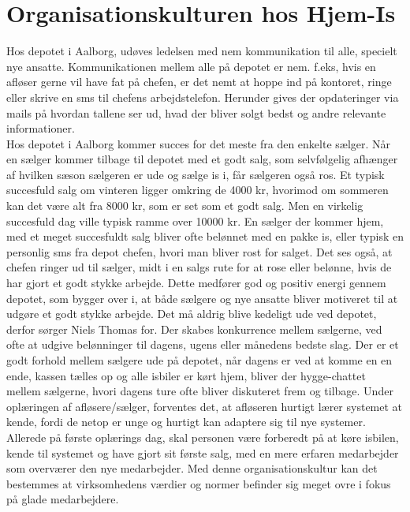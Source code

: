 \section{Organisationskulturen hos Hjem-Is}
Hos depotet i Aalborg, udøves ledelsen med nem kommunikation til alle, specielt nye ansatte. Kommunikationen mellem alle på depotet er nem. f.eks, hvis en afløser gerne vil have fat på chefen, er det nemt at hoppe ind på kontoret, ringe eller skrive en sms til chefens arbejdstelefon. Herunder gives der opdateringer via mails på hvordan tallene ser ud, hvad der bliver solgt bedst og andre relevante informationer. \\
Hos depotet i Aalborg kommer succes for det meste fra den enkelte sælger. Når en sælger kommer tilbage til depotet med et godt salg, som selvfølgelig afhænger af hvilken sæson sælgeren er ude og sælge is i, får sælgeren også ros. Et typisk succesfuld salg om vinteren ligger omkring de 4000 kr, hvorimod om sommeren kan det være alt fra 8000 kr, som er set som et godt salg. Men en virkelig succesfuld dag ville typisk ramme over 10000 kr. En sælger der kommer hjem, med et meget succesfuldt salg bliver ofte belønnet med en pakke is, eller typisk en personlig sms fra depot chefen, hvori man bliver rost for salget. Det ses også, at chefen ringer ud til sælger, midt i en salgs rute for at rose eller belønne, hvis de har gjort et godt stykke arbejde. Dette medfører god og positiv energi gennem depotet, som bygger over i, at både sælgere og nye ansatte bliver motiveret til at udgøre et godt stykke arbejde. Det må aldrig blive kedeligt ude ved depotet, derfor sørger Niels Thomas for. Der skabes konkurrence mellem sælgerne, ved ofte at udgive belønninger til dagens, ugens eller månedens bedste slag. Der er et godt forhold mellem sælgere ude på depotet, når dagens er ved at komme en en ende, kassen tælles op og alle isbiler er kørt hjem, bliver der hygge-chattet mellem sælgerne, hvori dagens ture ofte bliver diskuteret frem og tilbage. Under oplæringen af afløsere/sælger, forventes det, at afløseren hurtigt lærer systemet at kende, fordi de netop er unge og hurtigt kan adaptere sig til nye systemer. Allerede på første oplærings dag, skal personen være forberedt på at køre isbilen, kende til systemet og have gjort sit første salg, med en mere erfaren medarbejder som overværer den nye medarbejder. Med denne organisationskultur kan det bestemmes at virksomhedens værdier og normer befinder sig meget ovre i fokus på glade medarbejdere.

